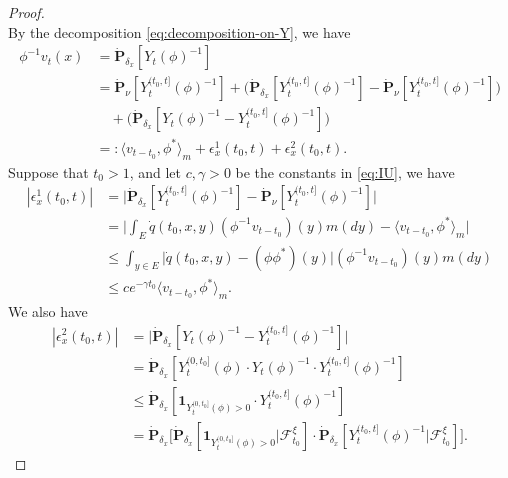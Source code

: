 \begin{proof}
\begin{equation}
\end{equation}
	By the decomposition \eqref{eq:decomposition-on-Y}, we have
\begin{equation}\label{eq:vt-equation}\begin{split}
	\phi^{-1}v_t(x)
	&= \dot {\mathbf P}_{\delta_x} [Y_t(\phi)^{-1}]\\
	&= \dot {\mathbf P}_\nu [Y^{(t_0,t]}_t(\phi)^{-1}] + \big( \dot {\mathbf P}_{\delta_x} [Y^{(t_0,t]}_t(\phi)^{-1}] - \dot {\mathbf P}_\nu [Y^{(t_0,t]}_t(\phi)^{-1}] \big) \\
	&\quad + \big( \dot{\mathbf P}_{\delta_x}[Y_t(\phi)^{-1} - Y^{(t_0,t]}_t(\phi)^{-1}] \big)\\
	&=: \langle v_{t-t_0},\phi^* \rangle_m + \epsilon_x^1(t_0,t) +\epsilon_x^2(t_0,t).
\end{split}\end{equation}
	Suppose that $t_0 >1$, and let $c,\gamma > 0$ be the constants in \eqref{eq:IU}, we have
\begin{equation}\label{eq:epsilon-1}\begin{split}
	|\epsilon_x^1(t_0,t)|
	& = \big| \dot {\mathbf P}_{\delta_x} [Y^{(t_0,t]}_t(\phi)^{-1}] - \dot {\mathbf P}_\nu [Y^{(t_0,t]}_t(\phi)^{-1}] \big| \\
	& = \big|  \int_E  \dot{q}(t_0,x,y)(\phi^{-1}v_{t-t_0})(y) m(dy) - \langle v_{t-t_0},\phi^* \rangle_m \big|\\
	& \leq \int_{y\in E} \big| \dot{q}(t_0,x,y) - (\phi\phi^*)(y) \big| (\phi^{-1}v_{t-t_0})(y) m(dy)\\
	& \leq ce^{-\gamma t_0}\langle v_{t-t_0},\phi^* \rangle_m .
\end{split}\end{equation}
	We also have
\begin{equation}\label{eq:epsilon-2}\begin{split}
	|\epsilon_x^2(t_0,t)|
	&= \big| \dot{\mathbf P}_{\delta_x}[Y_t(\phi)^{-1} - Y^{(t_0,t]}_t(\phi)^{-1}] \big| \\
	&= \dot{\mathbf P}_{\delta_x}[Y_t^{(0,t_0]}(\phi)\cdot Y_t(\phi)^{-1}\cdot Y^{(t_0,t]}_t(\phi)^{-1}]\\
	&\leq \dot{\mathbf P}_{\delta_x}[\mathbf 1_{Y_t^{(0,t_0]}(\phi)>0}\cdot Y^{(t_0,t]}_t(\phi)^{-1}]\\
	&= \dot{\mathbf P}_{\delta_x} \big[\dot{\mathbf P}_{\delta_x}[\mathbf 1_{Y_t^{(0,t_0]}(\phi)>0}|\mathscr F^\xi_{t_0}] \cdot \dot{\mathbf P}_{\delta_x}[ Y^{(t_0,t]}_t(\phi)^{-1}|\mathscr F^\xi_{t_0}] \big].
\end{split}\end{equation}

\end{proof}
